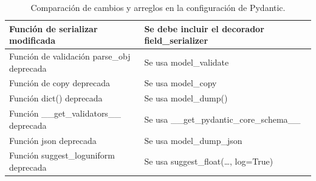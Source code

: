 \begin{table}[ht]
\begin{tabularx}{\textwidth}{|X|X|}
        \rowcolor[HTML]{F0F0F0}
        {Función de serializar modificada}                                                    & {Se debe incluir el decorador field\_serializer}                                        \\ \hline
        \rowcolor[HTML]{FFFFFF}
        { Función de validación parse\_obj deprecada}                                         & { Se usa model\_validate}                                                               \\ \hline
        \rowcolor[HTML]{F0F0F0}
        Función de copy deprecada                                                             & Se usa model\_copy                                                                      \\ \hline
        \rowcolor[HTML]{FFFFFF}
        Función dict() deprecada                                                              & Se usa model\_dump()                                                                    \\ \hline
        \rowcolor[HTML]{F0F0F0}
        Función \_\_get\_validators\_\_ deprecada                                             & Se usa \_\_get\_pydantic\_core\_schema\_\_                                              \\ \hline
        \rowcolor[HTML]{FFFFFF}
        Función json deprecada                                                                & Se usa model\_dump\_json                                                                \\ \hline
        \rowcolor[HTML]{F0F0F0}
        Función suggest\_loguniform deprecada                                                 & Se usa suggest\_float(…, log=True)                                                      \\ \hline
    \end{tabularx}
    \caption{Comparación de cambios y arreglos en la configuración de Pydantic.}
\end{table}